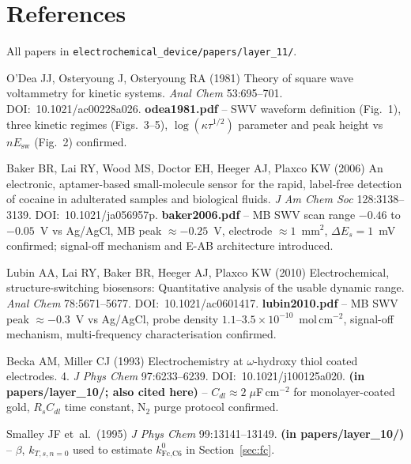 \documentclass[10pt,a4paper]{article}
\numberwithin{equation}{section}
\newcommand{\Des}{\Delta E_s}
\begin{document}
\section*{References}

\noindent All papers in \texttt{electrochemical\_device/papers/layer\_11/}.

\begin{enumerate}[label={[\arabic*]},noitemsep,leftmargin=*]

\item O'Dea JJ, Osteryoung J, Osteryoung RA (1981) Theory of square
  wave voltammetry for kinetic systems.
  \textit{Anal Chem} 53:695--701. DOI:~10.1021/ac00228a026.
  \textbf{odea1981.pdf} -- SWV waveform definition (Fig.~1), three
  kinetic regimes (Figs.~3--5), $\log(\kappa\tau^{1/2})$ parameter
  and peak height vs $n E_{\text{sw}}$ (Fig.~2) confirmed.

\item Baker BR, Lai RY, Wood MS, Doctor EH, Heeger AJ, Plaxco KW (2006)
  An electronic, aptamer-based small-molecule sensor for the rapid,
  label-free detection of cocaine in adulterated samples and
  biological fluids. \textit{J Am Chem Soc} 128:3138--3139.
  DOI:~10.1021/ja056957p.
  \textbf{baker2006.pdf} -- MB SWV scan range $-0.46$ to $-0.05$~V vs
  Ag/AgCl, MB peak $\approx -0.25$~V, electrode $\approx 1$~mm$^2$,
  $\Des = 1$~mV confirmed; signal-off mechanism and E-AB architecture
  introduced.

\item Lubin AA, Lai RY, Baker BR, Heeger AJ, Plaxco KW (2010)
  Electrochemical, structure-switching biosensors: Quantitative
  analysis of the usable dynamic range.
  \textit{Anal Chem} 78:5671--5677. DOI:~10.1021/ac0601417.
  \textbf{lubin2010.pdf} -- MB SWV peak $\approx -0.3$~V vs Ag/AgCl,
  probe density $1.1$--$3.5\times10^{-10}$~mol\,cm$^{-2}$, signal-off
  mechanism, multi-frequency characterisation confirmed.

\item Becka AM, Miller CJ (1993) Electrochemistry at $\omega$-hydroxy
  thiol coated electrodes. 4.
  \textit{J Phys Chem} 97:6233--6239. DOI:~10.1021/j100125a020.
  \textbf{(in papers/layer\_10/; also cited here)} --
  $C_{dl} \approx 2\;\mu$F\,cm$^{-2}$ for monolayer-coated gold,
  $R_s C_{dl}$ time constant, N$_2$ purge protocol confirmed.

\item Smalley JF et~al.\ (1995) \textit{J Phys Chem} 99:13141--13149.
  \textbf{(in papers/layer\_10/)} -- $\beta$, $k_{T,s,n=0}$ used to
  estimate $k^0_{\text{Fc,C6}}$ in Section~\ref{sec:fc}.

\end{enumerate}
\end{document}
